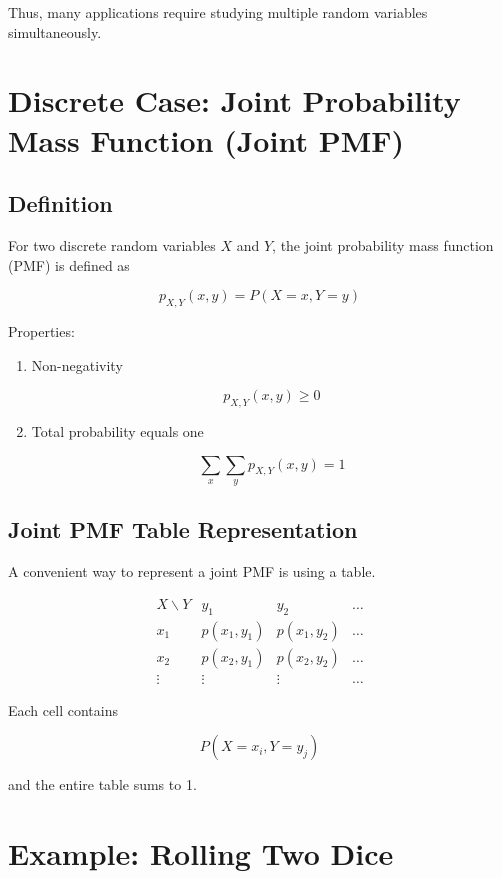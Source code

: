 \documentclass[12pt]{article}
\begin{document}
Thus, many applications require studying multiple random variables simultaneously.

\section{Discrete Case: Joint Probability Mass Function (Joint PMF)}

\subsection{Definition}

For two discrete random variables $X$ and $Y$, the joint probability mass function (PMF) is defined as

\[
p_{X,Y}(x,y) = P(X=x,Y=y)
\]

Properties:

\begin{enumerate}
\item Non-negativity

\[
p_{X,Y}(x,y) \ge 0
\]

\item Total probability equals one

\[
\sum_x \sum_y p_{X,Y}(x,y) = 1
\]

\end{enumerate}

\subsection{Joint PMF Table Representation}

A convenient way to represent a joint PMF is using a table.

\[
\begin{array}{c|ccc}
X\backslash Y & y_1 & y_2 & \dots \\
\hline
x_1 & p(x_1,y_1) & p(x_1,y_2) & \dots \\
x_2 & p(x_2,y_1) & p(x_2,y_2) & \dots \\
\vdots & \vdots & \vdots & \dots
\end{array}
\]

Each cell contains

\[
P(X=x_i,Y=y_j)
\]

and the entire table sums to 1.

\section{Example: Rolling Two Dice}
\end{document}
